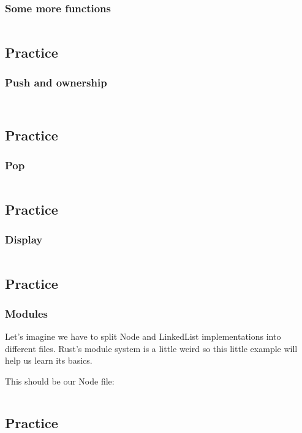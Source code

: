 \documentclass[usenames,twocolumn,dvipsnames,10pt,a4wide]{article}
\begin{document}
\subsubsection{Some more functions}
\inputminted[fontsize=\normalsize]{rust}{code/list5.rs}


\subsection{Practice}
	\subsubsection{Push and ownership}
\inputminted[fontsize=\normalsize]{rust}{code/list6.rs}

\inputminted[fontsize=\normalsize]{rust}{code/list7.rs}


\subsection{Practice}
	\subsubsection{Pop}
\inputminted[fontsize=\normalsize]{rust}{code/list8.rs}


\subsection{Practice}
	\subsubsection{Display}
\inputminted[fontsize=\normalsize]{rust}{code/list9.rs}


\subsection{Practice}
	\subsubsection{Modules}	
	Let's imagine we have to split Node and LinkedList implementations
	into different files. Rust's module system is a little weird so this
	little example will help us learn its basics.

	
	This should be our Node file:
	
	\inputminted[fontsize=\normalsize]{rust}{code/list10.rs}


\subsection{Practice}
\end{document}
